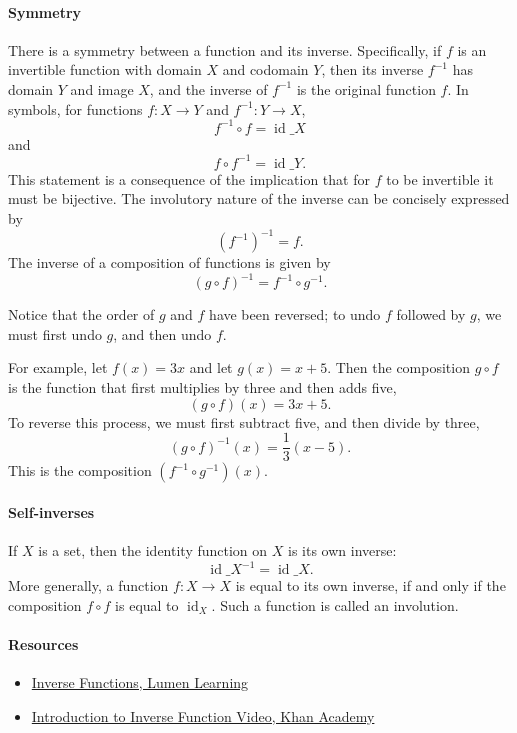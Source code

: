 \paragraph{Symmetry}

There is a symmetry between a function and its inverse. Specifically, if $f$ is an invertible function with domain $X$ and codomain $Y$, then its inverse $f^{-1}$ has domain $Y$ and image $X$, and the inverse of $f^{-1}$ is the original function $f$. In symbols, for functions $f: X \to Y$ and $f^{-1}: Y \to X$,
$$
f^{-1} \circ f = \operatorname{id}\_X
$$
and 
$$
f \circ f^{-1} = \operatorname{id}\_Y.
$$
This statement is a consequence of the implication that for $f$ to be invertible it must be bijective. The involutory nature of the inverse can be concisely expressed by
$$
\left(f^{-1}\right)^{-1} = f.
$$
The inverse of a composition of functions is given by
$$
(g \circ f)^{-1} = f^{-1} \circ g^{-1}.
$$

Notice that the order of $g$ and $f$ have been reversed; to undo $f$ followed by $g$, we must first undo $g$, and then undo $f$.

For example, let $f(x) = 3x$ and let $g(x) = x + 5$. Then the composition $g \circ f$ is the function that first multiplies by three and then adds five,
$$
(g \circ f)(x) = 3x + 5.
$$
To reverse this process, we must first subtract five, and then divide by three,
$$
(g \circ f)^{-1}(x) = \frac{1}{3}(x - 5).
$$
This is the composition $(f^{-1} \circ g^{-1})(x)$.

\paragraph{Self-inverses}

If $X$ is a set, then the identity function on $X$ is its own inverse:
$$
\operatorname{id}\_X^{-1} = \operatorname{id}\_X.
$$
More generally, a function $f : X \to X$ is equal to its own inverse, if and only if the composition $f \circ f$ is equal to $\operatorname{id}_X$. Such a function is called an involution.

\paragraph{Resources}

\begin{itemize}
    \item \href{https://courses.lumenlearning.com/collegealgebra2017/chapter/introduction-inverse-functions/}{Inverse Functions, Lumen Learning}
    \item \href{https://www.khanacademy.org/math/algebra/x2f8bb11595b61c86:functions/x2f8bb11595b61c86:inverse-functions-intro/v/introduction-to-function-inverses}{Introduction to Inverse Function Video, Khan Academy}
\end{itemize}

